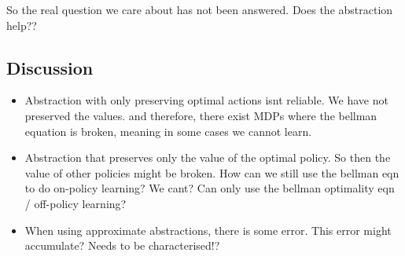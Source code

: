 So the real question we care about has not been answered. Does the abstraction help??


\subsection{Discussion}


\begin{itemize}
  \item Abstraction with only preserving optimal actions isnt reliable. We have not preserved the values.
  and therefore, there exist MDPs where the bellman equation is broken, meaning in some cases we cannot learn.
  \item Abstraction that preserves only the value of the optimal policy. So then the value of other policies might be broken.
  How can we still use the bellman eqn to do on-policy learning? We cant? Can only use the bellman optimality eqn / off-policy learning?
  \item When using approximate abstractions, there is some error. This error might accumulate? Needs to be characterised!?
\end{itemize}

%
%
%
%

